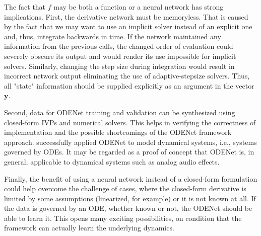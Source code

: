The fact that $f$ may be both a function or a neural network has strong implications. First, the derivative network must be memoryless. That is caused by the fact that we may want to use an implicit solver instead of an explicit one and, thus, integrate backwards in time. If the network maintained any information from the previous calls, the changed order of evaluation could severely obscure its output and would render its use impossible for implicit solvers. Similarly, changing the step size during integration would result in incorrect network output eliminating the use of adaptive-stepsize solvers. Thus, all "state" information should be supplied explicitly as an argument in the vector $\pmb{y}$.

Second, data for ODENet training and validation can be synthesized using closed-form \acp{IVP} and numerical solvers. This helps in verifying the correctness of implementation and the possible shortcomings of the ODENet framework approach.
\cite{Karlsson2019} successfully applied ODENet to model dynamical systems, i.e., systems governed by \acp{ODE}. It may be regarded as a proof of concept that ODENet is, in general, applicable to dynamical systems such as analog audio effects.

Finally, the benefit of using a neural network instead of a closed-form formulation could help overcome the challenge of cases, where the closed-form derivative is limited by some assumptions (linearized, for example) or it is not known at all. If the data is governed by an \ac{ODE}, whether known or not, the ODENet should be able to learn it. This opens many exciting possibilities, on condition that the framework can actually learn the underlying dynamics.
